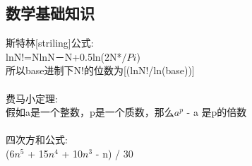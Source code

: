 \subsection{数学基础知识}
斯特林[striling]公式:\\
lnN!=NlnN－N+0.5ln(2N*$/Pi$)\\
所以base进制下N!的位数为[(lnN!/ln(base))]\\
\\
费马小定理:\\
假如a是一个整数，p是一个质数，那么$a^{p}$ - a 是p的倍数\\
\\
四次方和公式:\\
(6$n^{5}$ + 15$n^{4}$ + 10$n^{3}$ - n) / 30 
